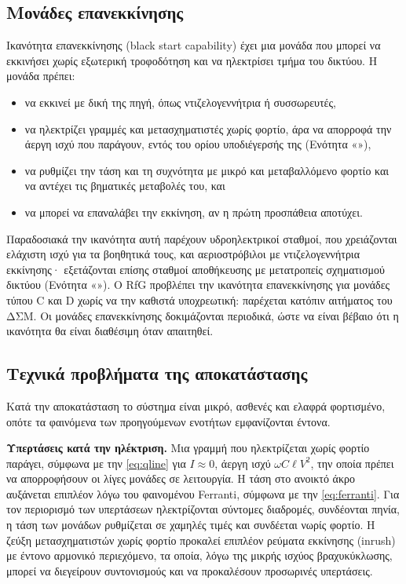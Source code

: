 \subsection{Μονάδες επανεκκίνησης}
\label{sec:blackstart}

Ικανότητα επανεκκίνησης (black start capability) έχει μια μονάδα που μπορεί να εκκινήσει χωρίς
εξωτερική τροφοδότηση και να ηλεκτρίσει τμήμα του δικτύου. Η μονάδα πρέπει:

\begin{itemize}
\item να εκκινεί με δική της πηγή, όπως ντιζελογεννήτρια ή συσσωρευτές,
\item να ηλεκτρίζει γραμμές και μετασχηματιστές χωρίς φορτίο, άρα να απορροφά την άεργη ισχύ που
      παράγουν, εντός του ορίου υποδιέγερσής της (Ενότητα «»),
\item να ρυθμίζει την τάση και τη συχνότητα με μικρό και μεταβαλλόμενο φορτίο και να αντέχει
      τις βηματικές μεταβολές του, και
\item να μπορεί να επαναλάβει την εκκίνηση, αν η πρώτη προσπάθεια αποτύχει.
\end{itemize}

Παραδοσιακά την ικανότητα αυτή παρέχουν υδροηλεκτρικοί σταθμοί, που χρειάζονται ελάχιστη ισχύ
για τα βοηθητικά τους, και αεριοστρόβιλοι με ντιζελογεννήτρια εκκίνησης· εξετάζονται επίσης
σταθμοί αποθήκευσης με μετατροπείς σχηματισμού δικτύου (Ενότητα «»).
Ο RfG προβλέπει την ικανότητα επανεκκίνησης για μονάδες τύπου C και D χωρίς να την καθιστά
υποχρεωτική: παρέχεται κατόπιν αιτήματος του ΔΣΜ. Οι μονάδες επανεκκίνησης δοκιμάζονται
περιοδικά, ώστε να είναι βέβαιο ότι η ικανότητα θα είναι διαθέσιμη όταν απαιτηθεί.

\subsection{Τεχνικά προβλήματα της αποκατάστασης}
\label{sec:restoration-issues}

Κατά την αποκατάσταση το σύστημα είναι μικρό, ασθενές και ελαφρά φορτισμένο, οπότε τα
φαινόμενα των προηγούμενων ενοτήτων εμφανίζονται έντονα.

\textbf{Υπερτάσεις κατά την ηλέκτριση.} Μια γραμμή που ηλεκτρίζεται χωρίς φορτίο παράγει,
σύμφωνα με την \eqref{eq:qline} για $I \approx 0$, άεργη ισχύ $\omega C \ell V^2$, την οποία
πρέπει να απορροφήσουν οι λίγες μονάδες σε λειτουργία. Η τάση στο ανοικτό άκρο αυξάνεται
επιπλέον λόγω του φαινομένου Ferranti, σύμφωνα με την \eqref{eq:ferranti}. Για τον περιορισμό
των υπερτάσεων ηλεκτρίζονται σύντομες διαδρομές, συνδέονται πηνία, η τάση των μονάδων
ρυθμίζεται σε χαμηλές τιμές και συνδέεται νωρίς φορτίο. Η ζεύξη μετασχηματιστών χωρίς φορτίο
προκαλεί επιπλέον ρεύματα εκκίνησης (inrush) με έντονο αρμονικό περιεχόμενο, τα οποία, λόγω της
μικρής ισχύος βραχυκύκλωσης, μπορεί να διεγείρουν συντονισμούς και να προκαλέσουν προσωρινές
υπερτάσεις.

